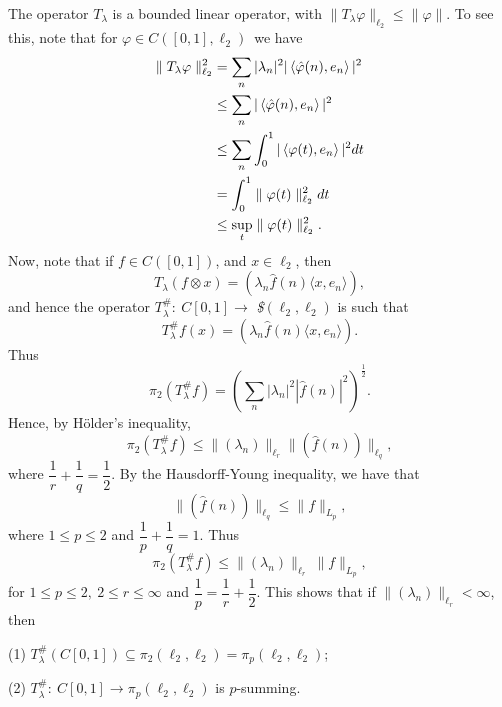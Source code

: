 \medskip

The
operator $T_\lambda$ is a bounded
linear operator, with $\parallel T_\lambda \varphi 
\parallel_{\ell_2}\leq \parallel \varphi
\parallel$.  To see this, note that for $\varphi\in C\left([0,1],
\ell_2\right)$\ we have
$$
\aligned
\parallel T_\lambda \varphi \parallel^2_{\ell_2}&=\sum\limits_n
|\lambda_n|^2|\,\langle \hat \varphi (n), e_n\rangle\,|^2\\
&\leq \sum\limits_n|\,\langle \hat \varphi (n), e_n\rangle\, |^2\\
&\leq \sum\limits_n\int^1_0|\,\langle \varphi (t), e_n\rangle\, 
|^2dt\\
&=\int^1_0\parallel \varphi (t)\parallel^2_{\ell_2}dt\\
&\leq \sup\limits_t\parallel \varphi 
(t)\parallel^2_{\ell_2}.\endaligned
$$
Now, note that if $f\in C\left([0,1]\right)$, and $x\in \ell_2$, then
$$
T_\lambda (f\otimes x)=\left(\lambda_n \hat f(n)\langle x,
e_n\rangle\right),
$$
and hence the operator $T_\lambda^\#:\ C[0,1]\rightarrow ${\it 
\$}$(\ell_2,
\ell_2)$ is such that
$$
T^{\#}_\lambda f (x)=\left(\lambda_n\hat f(n) \langle x, e_n \rangle 
\right).
$$
Thus
$$
\pi_2(T^\#_\lambda f)=\left(\sum\limits_n |\lambda_n|^2|\hat
f(n)|^2\right)^{\frac 12} .$$
Hence, by H\"older's inequality,
$$
\pi_2(T^\#_\lambda f)
\leq \parallel (\lambda_n)\parallel_{\ell_r}\parallel (\hat f
(n))\parallel_{\ell_q},
$$
where $\dfrac 1r+\dfrac 1q=\dfrac 12$.
By the Hausdorff-Young inequality, we have that
$$
\parallel (\hat f (n))\parallel_{\ell_q}\leq \parallel
f\parallel_{L_p},
$$
where $1\leq p\leq 2$ and $\dfrac 1p+\dfrac 1q=1$.  Thus
$$
\pi_2(T^\#_\lambda f)\leq \parallel (\lambda_n)\parallel_{\ell_r}\ 
\parallel
f\parallel_{L_p},
$$
for $1\leq p\leq 2,\ 2\leq r\leq \infty$ and $\dfrac 1p=\dfrac
1r+\dfrac 12$. 
This shows that if $\parallel
(\lambda_n)\parallel_{\ell_r}<\infty$, then
\item {(1)} $T^\#_\lambda\left(C[0,1]\right)\subseteq \pi_2 (\ell_2,
\ell_2)=\pi_p(\ell_2, \ell_2)$;
\item {(2)} $T^\#_\lambda:\ C[0,1]\longrightarrow
\pi_p(\ell_2, \ell_2)$ is $p$-summing.

\medskip

